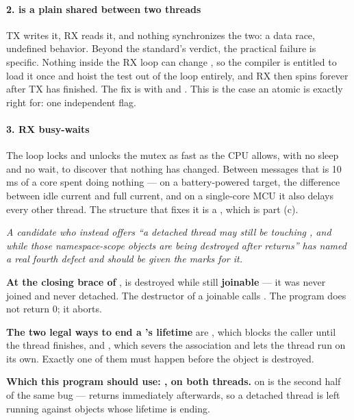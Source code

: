 \paragraph{2.  is a plain  shared between two threads}
TX writes it, RX reads it, and nothing synchronizes the two: a data race, undefined behavior. Beyond
the standard's verdict, the practical failure is specific. Nothing inside the RX loop can change
, so the compiler is entitled to load it once and hoist the test out of the loop
entirely, and RX then spins forever after TX has finished. The fix is
 with  and . This is
the case an atomic is exactly right for: one independent flag.

\paragraph{3. RX busy-waits}
The loop locks and unlocks the mutex as fast as the CPU allows, with no sleep and no wait, to
discover that nothing has changed. Between messages that is 10\,ms of a core spent doing nothing ---
on a battery-powered target, the difference between idle current and full current, and on a
single-core MCU it also delays every other thread. The structure that fixes it is a
, which is part (c).

\textit{A candidate who instead offers ``a detached thread may still be touching ,
 and  while those namespace-scope objects are being destroyed after
 returns'' has named a real fourth defect and should be given the marks for it.}

\textbf{At the closing brace of },  is destroyed while still
\textbf{joinable} --- it was never joined and never detached. The destructor of a joinable
 calls . The program does not return 0; it aborts.

\textbf{The two legal ways to end a 's lifetime} are , which blocks
the caller until the thread finishes, and , which severs the association and lets the
thread run on its own. Exactly one of them must happen before the  object is
destroyed. 

\textbf{Which this program should use: , on both threads.}  on 
is the second half of the same bug ---  returns immediately afterwards, so a detached
thread is left running against objects whose lifetime is ending. 

